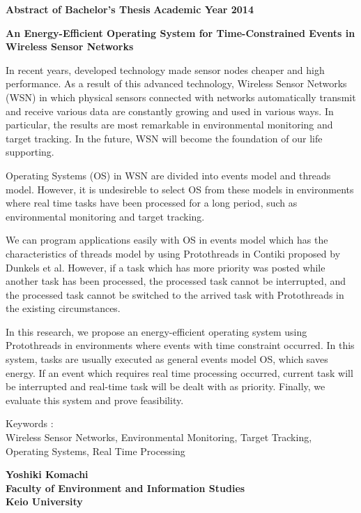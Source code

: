 \newpage

\begin{center}
\textbf{\Large Abstract of Bachelor's Thesis}
\textbf{\Large Academic Year 2014}
\vspace{6.18mm}

\textbf{\Large An Energy-Efficient Operating System for Time-Constrained Events in Wireless Sensor Networks}
\end{center}

\vspace{10mm}

In recent years, 
developed technology made 
sensor nodes cheaper and high performance.
As a result of this advanced technology, 
Wireless Sensor Networks (WSN) 
in which physical sensors connected with networks
automatically transmit and receive various data 
are constantly growing and used in various ways.
In particular, the results are most remarkable
in environmental monitoring and target tracking.
In the future, WSN will become the foundation of our life supporting. 

Operating Systems (OS) in WSN
are divided into events model and threads model.
However, it is undesireble to 
select OS from these models  
in environments where 
real time tasks have been processed 
for a long period,
such as environmental monitoring and target tracking.

We can program applications easily
with OS
in events model which
has the characteristics of threads model
by using Protothreads 
in Contiki proposed by Dunkels et al.
However, 
if a task which has more priority was posted 
while another task has been processed,
the processed task cannot be interrupted,
and the processed task cannot be switched to the arrived task 
with Protothreads
in the existing circumstances.

In this research, we propose an energy-efficient operating system 
using Protothreads
in environments where events with time constraint occurred.
In this system,
tasks are usually executed as general events model OS, 
which saves energy.
If an event which requires real time processing occurred,
current task will be interrupted and 
real-time task will be dealt with as priority.
Finally, we evaluate this system and prove feasibility.


\vspace{10mm}
Keywords :\\
\hspace{3.5em}Wireless Sensor Networks, Environmental Monitoring, Target Tracking, Operating Systems, Real Time Processing 
\begin{flushright}
\textbf{Yoshiki Komachi}\\
\vspace{5mm}
\textbf{Faculty of Environment and Information Studies}\\
\textbf{Keio University}
\end{flushright}
